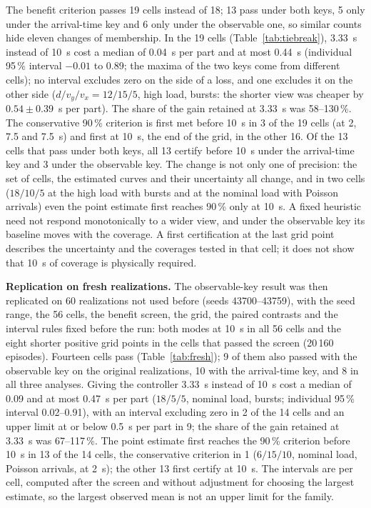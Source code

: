\documentclass[11pt,a4paper]{article}
\begin{document}
The benefit criterion passes 19 cells instead of 18; 13 pass under both keys, 5 only
under the arrival-time key and 6 only under the observable one, so similar counts hide
eleven changes of membership. In the 19 cells (Table~\ref{tab:tiebreak}), 3.33~s instead
of 10~s cost a median of 0.04~s per part and at most 0.44~s (individual 95\,\% interval
$-0.01$ to 0.89; the maxima of the two keys come from different cells); no interval
excludes zero on the side of a loss, and one excludes it on the other side ($d/v_y/v_x=12/15/5$,
high load, bursts: the shorter view was cheaper by $0.54\pm0.39$~s per part). The share of
the gain retained at 3.33~s was 58--130\,\%. The conservative 90\,\% criterion is first met
before 10~s in 3 of the 19 cells (at 2, 7.5 and 7.5~s) and first at 10~s, the end of the
grid, in the other 16. Of the 13 cells that pass under both keys, all 13 certify before
10~s under the arrival-time key and 3 under the observable key. The change is not only one
of precision: the set of cells, the estimated curves and their uncertainty all change, and
in two cells ($18/10/5$ at the high load with bursts and at the nominal load with Poisson
arrivals) even the point estimate first reaches 90\,\% only at 10~s. A fixed heuristic need
not respond monotonically to a wider view, and under the observable key its baseline moves
with the coverage. A first certification at the last grid point describes the uncertainty
and the coverages tested in that cell; it does not show that 10~s of coverage is
physically required.

\textbf{Replication on fresh realizations.} The observable-key result was then replicated on
60 realizations not used before (seeds 43700--43759), with the seed range, the 56 cells, the
benefit screen, the grid, the paired contrasts and the interval rules fixed before the
run: both modes at 10~s in all 56 cells and the eight shorter positive grid points in the
cells that passed the screen (20\,160 episodes). Fourteen cells pass
(Table~\ref{tab:fresh}); 9 of them also passed with the observable key on the original
realizations, 10 with the arrival-time key, and 8 in all three analyses. Giving the
controller 3.33~s instead of 10~s cost a median of 0.09 and at most 0.47~s per part
($18/5/5$, nominal load, bursts; individual 95\,\% interval 0.02--0.91), with an interval
excluding zero in 2 of the 14 cells and an upper limit at or below 0.5~s per part in 9; the
share of the gain retained at 3.33~s was 67--117\,\%. The point estimate first reaches the
90\,\% criterion before 10~s in 13 of the 14 cells, the conservative criterion in 1
($6/15/10$, nominal load, Poisson arrivals, at 2~s); the other 13 first certify at 10~s. The
intervals are per cell, computed after the screen and without adjustment for choosing the
largest estimate, so the largest observed mean is not an upper limit for the family.
\end{document}
